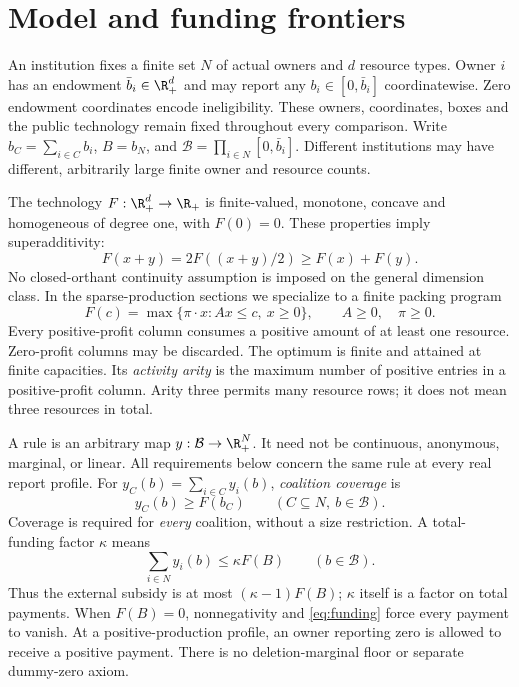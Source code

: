 \section{Model and funding frontiers}\label{sec:model}
An institution fixes a finite set $N$ of actual owners and $d$ resource types.
Owner $i$ has an endowment $\bar b_i\in\R_+^d$ and may report any
$b_i\in[0,\bar b_i]$ coordinatewise. Zero endowment coordinates encode
ineligibility. These owners, coordinates, boxes and the public technology
remain fixed throughout every comparison. Write $b_C=\sum_{i\in C}b_i$,
$B=b_N$, and $\mathcal B=\prod_{i\in N}[0,\bar b_i]$.
Different institutions may have different, arbitrarily large finite owner and
resource counts.

The technology $F:\R_+^d\to\R_+$ is finite-valued, monotone, concave and
homogeneous of degree one, with $F(0)=0$. These properties imply
superadditivity:
\begin{equation}\label{eq:superadditive}
 F(x+y)=2F((x+y)/2)\ge F(x)+F(y).
\end{equation}
No closed-orthant continuity assumption is imposed on the general dimension
class. In the sparse-production sections we specialize to a finite packing
program
\begin{equation}\label{eq:packing}
 F(c)=\max\{\pi\cdot x: Ax\le c,\ x\ge0\},\qquad A\ge0,\quad\pi\ge0.
\end{equation}
Every positive-profit column consumes a positive amount of at least one
resource. Zero-profit columns may be discarded. The optimum is finite and
attained at finite capacities. Its \emph{activity arity} is the maximum number
of positive entries in a positive-profit column. Arity three permits many
resource rows; it does not mean three resources in total.

A rule is an arbitrary map $y:\mathcal B\to\R_+^N$.
It need not be continuous, anonymous, marginal, or linear. All requirements
below concern the same rule at every real report profile. For
$y_C(b)=\sum_{i\in C}y_i(b)$, \emph{coalition coverage} is
\begin{equation}\label{eq:coverage}
 y_C(b)\ge F(b_C)\qquad(C\subseteq N,\ b\in\mathcal B).
\end{equation}
Coverage is required for \emph{every} coalition, without a size restriction.
A total-funding factor $\kappa$ means
\begin{equation}\label{eq:funding}
 \sum_{i\in N}y_i(b)\le\kappa F(B)\qquad(b\in\mathcal B).
\end{equation}
Thus the external subsidy is at most $(\kappa-1)F(B)$; $\kappa$ itself is a
factor on total payments. When $F(B)=0$, nonnegativity and
\eqref{eq:funding} force every payment to vanish. At a positive-production
profile, an owner reporting zero is allowed to receive a positive payment.
There is no deletion-marginal floor or separate dummy-zero axiom.

